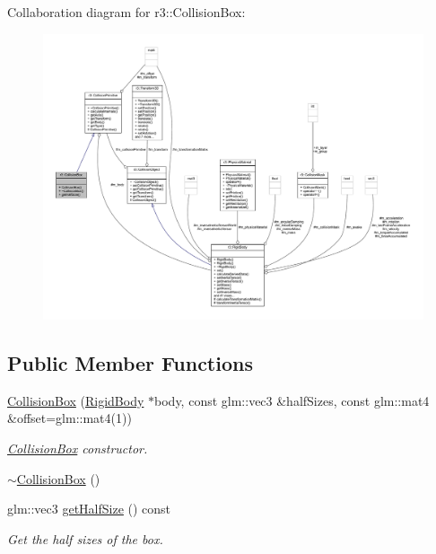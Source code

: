 Collaboration diagram for r3\+:\+:Collision\+Box\+:\nopagebreak
\begin{figure}[H]
\begin{center}
\leavevmode
\includegraphics[width=350pt]{classr3_1_1_collision_box__coll__graph}
\end{center}
\end{figure}
\subsection*{Public Member Functions}
\begin{DoxyCompactItemize}
\item 
\mbox{\hyperlink{classr3_1_1_collision_box_af20be9fdcddf3a94d195fabf22d8ad3a}{Collision\+Box}} (\mbox{\hyperlink{classr3_1_1_rigid_body}{Rigid\+Body}} $\ast$body, const glm\+::vec3 \&half\+Sizes, const glm\+::mat4 \&offset=glm\+::mat4(1))
\begin{DoxyCompactList}\small\item\em \mbox{\hyperlink{classr3_1_1_collision_box}{Collision\+Box}} constructor. \end{DoxyCompactList}\item 
\mbox{\hyperlink{classr3_1_1_collision_box_aab1d8f1b7999c61cff10b631305cc4f3}{$\sim$\+Collision\+Box}} ()
\item 
glm\+::vec3 \mbox{\hyperlink{classr3_1_1_collision_box_a6d35bfc27fd291409cb5e90ae2464179}{get\+Half\+Size}} () const
\begin{DoxyCompactList}\small\item\em Get the half sizes of the box. \end{DoxyCompactList}\end{DoxyCompactItemize}

